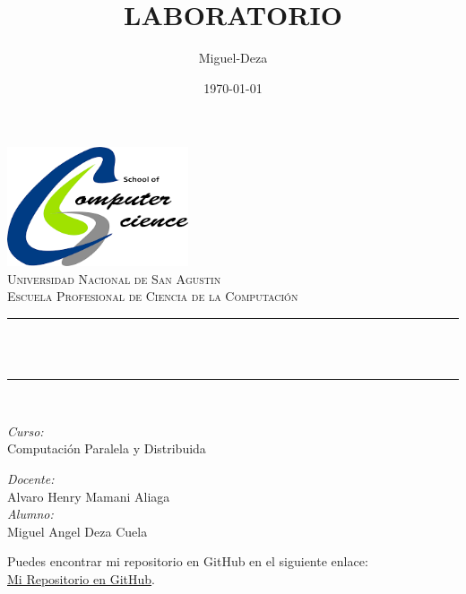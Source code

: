 \documentclass{article}
\title{LABORATORIO}
\author{Miguel-Deza}
\date{\today}
\begin{document}
    \begin{center}
        \includegraphics[width=0.4\textwidth]{logos/cs.png}\\[1cm]

        \textsc{\LARGE Universidad Nacional de San Agustin}\\[1.0cm]
        \textsc{\Large Escuela Profesional de Ciencia de la Computación}\\[1.5cm]

        \rule{\linewidth}{0.5mm}\\[0.4cm]
        {\huge\bfseries \thetitle}\\
        \rule{\linewidth}{0.5mm}\\[1.5cm]

        \begin{minipage}{0.4\textwidth}
            \begin{flushleft}
                \large
                \emph{Curso:}\\
                Computación Paralela y Distribuida
            \end{flushleft}
        \end{minipage}
        \begin{minipage}{0.4\textwidth}
            \begin{flushright}
                \large
                \emph{Docente:}\\
                Alvaro Henry Mamani Aliaga\\[0.5cm]
                \emph{Alumno:}\\
                Miguel Angel Deza Cuela\\[0.5cm]
                
            \end{flushright}
        \end{minipage}

        \vfill %
        Puedes encontrar mi repositorio en GitHub en el siguiente enlace: \\
    \href{https://github.com/Miguel-Deza/CPYD-LABS}{Mi Repositorio en GitHub}.\\[0.5cm]

        {\large \thedate}

    \end{center}
    
\newpage

\end{document}
